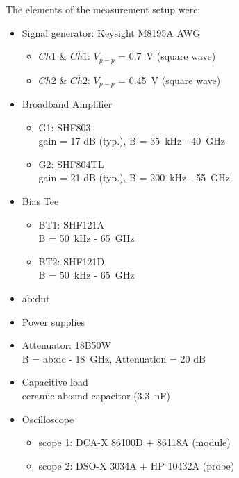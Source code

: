 

The elements of the measurement setup were:
\begin{itemize}
	\item Signal generator: Keysight M8195A AWG
	\begin{itemize}
		\item $Ch1$ \& $\overline{Ch1}$: $V_{p-p}$ = \SI{0.7}{\volt} (square wave)
		\item $Ch2$ \& $\overline{Ch2}$: $V_{p-p}$ = \SI{0.45}{\volt} (square wave)
	\end{itemize}
	\item Broadband Amplifier
	\begin{itemize}
		\item G1: SHF803\\ gain = 17 dB (typ.), B = \SI{35}{\kilo \hertz} -  \SI{40}{\giga \hertz}
		\item G2: SHF804TL\\ gain = 21 dB (typ.), B = \SI{200}{\kilo \hertz} -  \SI{55}{\giga \hertz}
	\end{itemize}
	\item Bias Tee 
	\begin{itemize}
		\item BT1: SHF121A\\ B = \SI{50}{\kilo \hertz} -  \SI{65}{\giga \hertz}
		\item BT2: SHF121D\\ B = \SI{50}{\kilo \hertz} -  \SI{65}{\giga \hertz}
	\end{itemize}
	\item \gls{ab:dut}
	\item Power supplies
	\item Attenuator: 18B50W\\ B = \gls{ab:dc} -  \SI{18}{\giga \hertz}, Attenuation = 20 dB
	\item Capacitive load\\
	ceramic \gls{ab:smd} capacitor (\SI{3.3}{\nano \farad})
	\item Oscilloscope
	\begin{itemize}
		\item scope 1: DCA-X 86100D + 86118A (module)
		\item scope 2: DSO-X 3034A + HP 10432A (probe)
	\end{itemize}		
\end{itemize}


